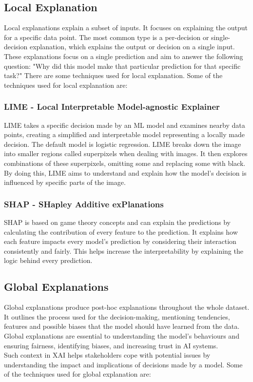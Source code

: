 \documentclass[10pt,journal,compsoc]{IEEEtran}
\begin{document}
\subsection{Local Explanation} Local explanations explain a subset of inputs. It focuses on explaining the output for a specific data point. The most common type is a per-decision or single-decision explanation, which explains the output or decision on a single input.\cite{phillips2020four}
These explanations focus on a single prediction and aim to answer the following question: "Why did this model make that particular prediction for that specific task?" There are some techniques used for local explanation. Some of the techniques used for local explanation are:

\subsubsection{LIME - Local Interpretable Model-agnostic Explainer}
LIME takes a specific decision made by an ML model and examines nearby data points, creating a simplified and interpretable model representing a locally made decision\cite{phillips2020four}. The default model is logistic regression.
LIME breaks down the image into smaller regions called superpixels when dealing with images. It then explores combinations of these superpixels, omitting some and replacing some with black. By doing this, LIME aims to understand and explain how the model's decision is influenced by specific parts of the image.

\subsubsection{SHAP - SHapley Additive exPlanations} SHAP is based on game theory concepts and can explain the predictions by calculating the contribution of every feature to the prediction. It explains how each feature impacts every model's prediction by considering their interaction consistently and fairly. This helps increase the interpretability by explaining the logic behind every prediction.\cite{why-trust-you}

\subsection{Global Explanations}
Global explanations produce post-hoc explanations throughout the whole dataset. It outlines the process used for the decision-making, mentioning tendencies,\\
features and possible biases that the model should have learned from the data. Global explanations are essential to understanding the model's behaviours and ensuring fairness, identifying biases, and increasing trust in AI systems.\cite{phillips2020four} \\
Such context in XAI helps stakeholders cope with potential issues by understanding the impact and implications of decisions made by a model. Some of the techniques used for global explanation are:
\end{document}
